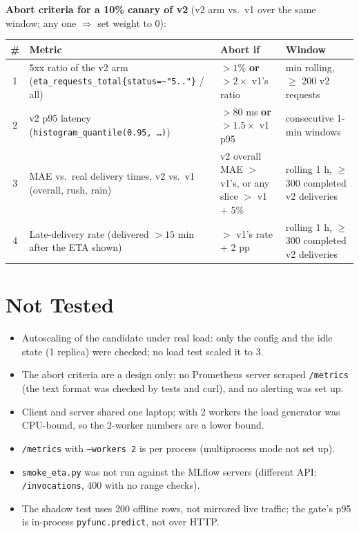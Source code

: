 \documentclass[10pt]{article}
\newcommand{\code}[1]{\texttt{#1}}
\begin{document}
\textbf{Abort criteria for a 10\% canary of v2} (v2 arm vs.\ v1 over the same window; any one $\Rightarrow$ set weight to 0):
\begin{center}
\small
\begin{tabular}{|c|>{\raggedright}p{5.6cm}|>{\raggedright}p{4.2cm}|>{\raggedright\arraybackslash}p{4.3cm}|}
\hline
\textbf{\#} & \textbf{Metric} & \textbf{Abort if} & \textbf{Window} \\ \hline
1 & 5xx ratio of the v2 arm (\code{eta\_requests\_total\{status=\~{}"5.."\}} / all) & $> 1\%$ \textbf{or} $> 2\times$ v1's ratio & 5 min rolling, $\ge$ 200 v2 requests \\ \hline
2 & v2 p95 latency (\code{histogram\_quantile(0.95, \dots)}) & $> 80$ ms \textbf{or} $> 1.5\times$ v1 p95 & 3 consecutive 1-min windows \\ \hline
3 & MAE vs.\ real delivery times, v2 vs.\ v1 (overall, rush, rain) & v2 overall MAE $>$ v1's, or any slice $>$ v1 + 5\% & rolling 1 h, $\ge$ 300 completed v2 deliveries \\ \hline
4 & Late-delivery rate (delivered $> 15$ min after the ETA shown) & $>$ v1's rate + 2 pp & rolling 1 h, $\ge$ 300 completed v2 deliveries \\ \hline
\end{tabular}
\end{center}

\section{Not Tested}
\begin{itemize}
  \item Autoscaling of the candidate under real load: only the config and the idle state (1 replica) were checked; no load test scaled it to 3.
  \item The abort criteria are a design only: no Prometheus server scraped \code{/metrics} (the text format was checked by tests and curl), and no alerting was set up.
  \item Client and server shared one laptop; with 2 workers the load generator was CPU-bound, so the 2-worker numbers are a lower bound.
  \item \code{/metrics} with \code{--workers 2} is per process (multiprocess mode not set up).
  \item \code{smoke\_eta.py} was not run against the MLflow servers (different API: \code{/invocations}, 400 with no range checks).
  \item The shadow test uses 200 offline rows, not mirrored live traffic; the gate's p95 is in-process \code{pyfunc.predict}, not over HTTP.
\end{itemize}
\end{document}
